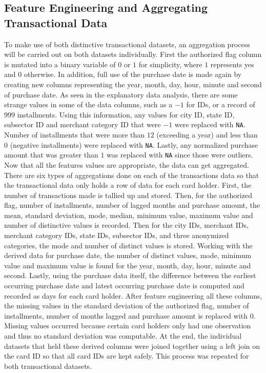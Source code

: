 \documentclass[journal, a4paper]{IEEEtran}
\begin{document}
\subsection{Feature Engineering and Aggregating Transactional Data}
To make use of both distinctive transactional datasets, an aggregation process will be carried out on both datasets individually. First the authorized flag column is mutated into a binary variable of $0$ or $1$ for simplicity, where $1$ represents yes and $0$ otherwise. In addition, full use of the purchase date is made again by creating new columns representing the year, month, day, hour, minute and second of purchase date. As seen in the explanatory data analysis, there are some strange values in some of the data columns, such as a $-1$ for IDs, or a record of $999$ installments. Using this information, any values for city ID, state ID, subsector ID and merchant category ID that were $-1$ were replaced with \texttt{NA}. Number of installments that were more than $12$ (exceeding a year) and less than $0$ (negative installments) were replaced with \texttt{NA}. Lastly, any normalized purchase amount that was greater than $1$ was replaced with \texttt{NA} since those were outliers. Now that all the features values are appropriate, the data can get aggregated. There are six types of aggregations done on each of the transactions data so that the transactional data only holds a row of data for each card holder. First, the number of transactions made is tallied up and stored. Then, for the authorized flag, number of installments, number of lagged months and purchase amount, the mean, standard deviation, mode, median, minimum value, maximum value and number of distinctive values is recorded. Then for the city IDs, merchant IDs, merchant category IDs, state IDs, subsector IDs, and three anonymized categories, the mode and number of distinct values is stored. Working with the derived data for purchase date, the number of distinct values, mode, minimum value and maximum value is found for the year, month, day, hour, minute and second. Lastly, using the purchase data itself, the difference between the earliest occurring purchase date and latest occurring purchase date is computed and recorded as days for each card holder. After feature engineering all these columns, the missing values in the standard deviation of the authorized flag, number of installments, number of months lagged and purchase amount is replaced with $0$. Missing values occurred because certain card holders only had one observation and thus no standard deviation was computable. At the end, the individual datasets that held these derived columns were joined together using a left join on the card ID so that all card IDs are kept safely. This process was repeated for both transactional datasets. 
\end{document}
